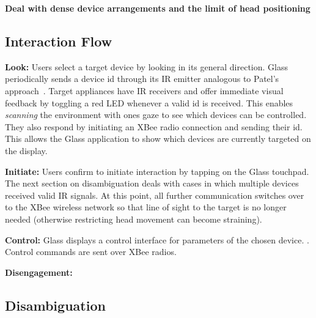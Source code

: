 {\bf Deal with dense device arrangements and the limit of head positioning}


\subsection{Interaction Flow}
{\bf Look:} Users select a target device by looking in its general direction.
Glass periodically sends a device id through its IR emitter analogous to Patel's approach~\cite{patel_2-way_2003}. Target appliances have IR receivers and offer immediate visual feedback by toggling a red LED whenever a valid id is received. This enables {\em scanning} the environment with ones gaze to see which devices can be controlled. They also respond by initiating an XBee radio connection and sending their id. This allows the Glass application to show which devices are currently targeted on the display. 

{\bf Initiate:} Users confirm to initiate interaction by tapping on the Glass touchpad. The next section on disambiguation deals with cases in which multiple devices received valid IR signals. At this point, all further communication switches over to the XBee wireless network so that line of sight to the target is no longer needed (otherwise restricting head movement can become straining).

{\bf Control:} Glass displays a control interface for parameters of the chosen device. .
Control commands are sent over XBee radios.

{\bf Disengagement:}  

\subsection{Disambiguation}

